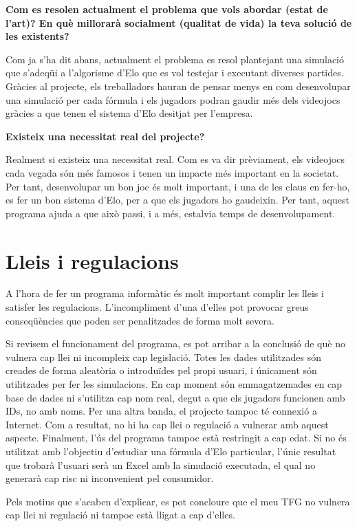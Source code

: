 \documentclass[a4paper]{article}
\begin{document}
\textbf{Com es resolen actualment el problema que vols abordar (estat de l'art)? En què millorarà socialment (qualitat de vida) la teva solució de les existents?}

Com ja s'ha dit abans, actualment el problema es resol plantejant una simulació que s'adeqüi a l'algorisme d'Elo que es vol testejar i executant diverses partides. Gràcies al projecte, els treballadors hauran de pensar menys en com desenvolupar una simulació per cada fórmula i els jugadors podran gaudir més dels videojocs gràcies a que tenen el sistema d'Elo desitjat per l'empresa. 

\newpage

\textbf{Existeix una necessitat real del projecte?}

Realment si existeix una necessitat real. Com es va dir prèviament, els videojocs cada vegada són més famosos i tenen un impacte més important en la societat. Per tant, desenvolupar un bon joc és molt important, i una de les claus en fer-ho, es fer un bon sistema d'Elo, per a que els jugadors ho gaudeixin. Per tant, aquest programa ajuda a que això passi, i a més, estalvia temps de desenvolupament.

\newpage
\section{Lleis i regulacions}
A l'hora de fer un programa informàtic és molt important complir les lleis i satisfer les regulacions. L'incompliment d'una d'elles pot provocar greus conseqüències que poden ser penalitzades de forma molt severa. 

Si revisem el funcionament del  programa, es pot arribar a la conclusió de què no vulnera cap llei ni incompleix cap legislació. Totes les dades utilitzades són creades de forma aleatòria o introduïdes pel propi usuari, i únicament són utilitzades per fer les simulacions. En cap moment són emmagatzemades en cap base de dades ni s'utilitza cap nom real, degut a que els jugadors funcionen amb IDs, no amb noms. 
Per una altra banda, el projecte tampoc té connexió a Internet. Com a resultat, no hi ha cap llei o regulació a vulnerar amb aquest aspecte. Finalment, l'ús del programa tampoc està restringit a cap edat. Si no és utilitzat amb l'objectiu d'estudiar una fórmula d'Elo particular, l'únic resultat que trobarà l'usuari serà un Excel amb la simulació executada, el qual no generarà cap risc ni inconvenient pel consumidor.

Pels motius que s'acaben d'explicar, es pot concloure que el meu TFG no vulnera cap llei ni regulació ni tampoc està lligat a cap d'elles.
\end{document}

